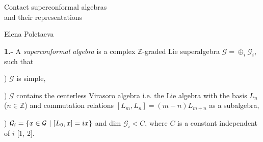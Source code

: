 \documentclass[a4paper,a4paper]{article}
\begin{document}
\begin{center}
{\Large Contact superconformal algebras}\\
{\Large and their representations}
\end{center}
\vskip 0.1in
\begin{center}
{\large Elena Poletaeva}
\end{center}
\vskip 0.1in

{\bf 1.-}
A {\it superconformal algebra}  is a complex
${\mathbb Z}$-graded Lie superalgebra $\mathcal G = \oplus_i\mathcal G_i$, such that

) $\mathcal G$ is simple,

) $\mathcal G$ contains the centerless Virasoro algebra 
i.e. the Lie algebra with the basis $L_n$ ($n\in\mathbb Z$) and commutation relations
$[L_m, L_n] = (m - n)L_{m+n}$ as a subalgebra,

) $\mathcal G_i = \lbrace x\in\mathcal G \hbox{ }|\hbox{ }
 [L_0, x] = ix\rbrace$ and dim $\mathcal G_i < C$,
where $C$ is a constant independent of $i$ [1, 2].
\end{document}
